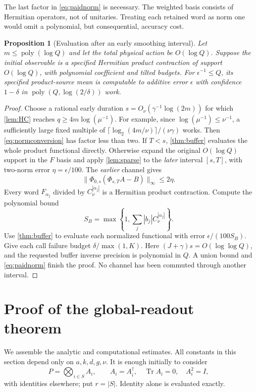 \documentclass[11pt,reqno]{amsart}
\numberwithin{equation}{section}
\newtheorem{proposition}[theorem]{Proposition}
\theoremstyle{definition}
\theoremstyle{remark}
\newcommand{\Tr}{\operatorname{Tr}}
\newcommand{\poly}{\operatorname{poly}}
\newcommand{\nn}[1]{\lVert#1\rVert}
\begin{document}
The last factor in \eqref{eq:paidnorm} is necessary. The weighted basis consists of Hermitian operators, not of unitaries. Treating each retained word as norm one would omit a polynomial, but consequential, accuracy cost.

\begin{proposition}[Evaluation after an early smoothing interval]\label{prop:smoothingevaluation}
Let $m\leq\poly(\log Q)$ and let the total physical action be $O(\log Q)$. Suppose the initial observable is a specified Hermitian product contraction of support $O(\log Q)$, with polynomial coefficient and tilted budgets. For $\epsilon^{-1}\leq Q$, its specified product-source mean is computable to additive error $\epsilon$ with confidence $1-\delta$ in $\poly(Q,\log(2/\delta))$ work.
\end{proposition}
\begin{proof}
Choose a rational early duration $s=O_\nu(\gamma^{-1}\log(2m))$ for which \cref{lem:HC} reaches $q\geq4m\log(\mu^{-1})$. For example, since $\log(\mu^{-1})\leq\nu^{-1}$, a sufficiently large fixed multiple of $\lceil\log_2(4m/\nu)\rceil/(\nu\gamma)$ works. Then \eqref{eq:normconversion} has factor less than two. If $T<s$, \cref{thm:buffer} evaluates the whole product functional directly. Otherwise expand the original $O(\log Q)$ support in the $F$ basis and apply \cref{lem:sparse} to the \emph{later} interval $[s,T]$, with two-norm error $\eta=\epsilon/100$. The \emph{earlier} channel gives
\[
 \nn{\Phi_{0,s}(\Phi_{s,T}A-B)}_\infty\leq2\eta.
\]
Every word $F_{\alpha_j}$ divided by $C_\nu^{|\alpha_j|}$ is a Hermitian product contraction. Compute the polynomial bound
\[
 S_B=\max\left\{1,\sum_j|b_j|C_\nu^{|\alpha_j|}\right\}.
\]
Use \cref{thm:buffer} to evaluate each normalized functional with error $\epsilon/(100S_B)$. Give each call failure budget $\delta/\max(1,K)$. Here $(J+\gamma)s=O(\log\log Q)$, and the requested buffer inverse precision is polynomial in $Q$. A union bound and \eqref{eq:paidnorm} finish the proof. No channel has been commuted through another interval.
\end{proof}


\section{Proof of the global-readout theorem}\label{sec:assembly}

We assemble the analytic and computational estimates. All constants in this section depend only on $a,k,d,g,\nu$. It is enough initially to consider
\[
 P=\bigotimes_{i\in S}A_i,\qquad
 A_i=A_i^\dagger,\quad\Tr A_i=0,\quad A_i^2=I,
\]
with identities elsewhere; put $r=|S|$. Identity alone is evaluated exactly.
\end{document}
